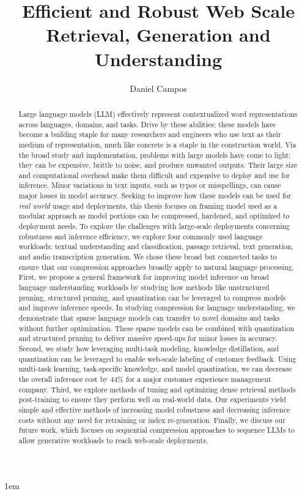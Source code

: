 \documentclass[draftthesis,tocnosub,noragright,centerchapter,fullpagesingle,12pt]{uiuc_csthesis21}
\title{Efficient and Robust Web Scale Retrieval, Generation and Understanding}
\author{Daniel Campos}
\theoremstyle{definition}
\numberwithin{algocf}{chapter}
\begin{document}
\maketitle
\parindent 1em%

\frontmatter
\begin{abstract}
Large language models (LLM) effectively represent contextualized word representations across languages, domains, and tasks. Drive by these abilities; these models have become a building staple for many researchers and engineers who use text as their medium of representation, much like concrete is a staple in the construction world. Via the broad study and implementation, problems with large models have come to light: they can be expensive, brittle to noise, and produce unwanted outputs. Their large size and computational overhead make them difficult and expensive to deploy and use for inference. Minor variations in text inputs, such as typos or misspellings, can cause major losses in model accuracy. Seeking to improve how these models can be used for \textit{real world} usage and deployments, this thesis focuses on framing model used as a modular approach as model portions can be compressed, hardened, and optimized to deployment needs. To explore the challenges with large-scale deployments concerning robustness and inference efficiency, we explore four commonly used language workloads: textual understanding and classification, passage retrieval, text generation, and audio transcription generation. We chose these broad but connected tasks to ensure that our compression approaches broadly apply to natural language processing. First, we propose a general framework for improving model inference on broad language understanding workloads by studying how methods like unstructured pruning, structured pruning, and quantization can be leveraged to compress models and improve inference speeds. In studying compression for language understanding, we demonstrate that sparse language models can transfer to novel domains and tasks without further optimization. These sparse models can be combined with quantization and structured pruning to deliver massive speed-ups for minor losses in accuracy. Second, we study how leveraging multi-task modeling, knowledge distillation, and quantization can be leveraged to enable web-scale labeling of customer feedback. Using multi-task learning, task-specific knowledge, and model quantization, we can decrease the overall inference cost by 44\% for a major customer experience management company.  Third, we explore methods of tuning and optimizing dense retrieval methods post-training to ensure they perform well on real-world data. Our experiments yield simple and effective methods of increasing model robustness and decreasing inference costs without any need for retraining or index re-generation. Finally, we discuss our future work, which focuses on sequential compression approaches to sequence LLMs to allow generative workloads to reach web-scale deployments.
\end{abstract}
\tableofcontents
\mainmatter
\end{document}
